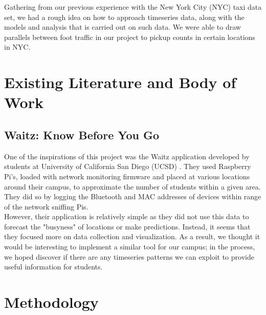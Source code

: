 \documentclass[journal, 11pt]{IEEEtran}
\begin{document}
\noindent Gathering from our previous experience with the New York City (NYC) taxi data set, we had a rough idea on how to approach timeseries data, along with the models and analysis that is carried out on such data. We were able to draw parallels between foot traffic in our project to pickup counts in certain locations in NYC.


\section{Existing Literature and Body of Work}

\subsection{Waitz: Know Before You Go}

\noindent One of the inspirations of this project was the Waitz application developed by students at University of California San Diego (UCSD) \cite{waitz}. They used Raspberry Pi's, loaded with network monitoring firmware and placed at various locations around their campus, to approximate the number of students within a given area. They did so by logging the Bluetooth and MAC addresses of devices within range of the network sniffing Pis.\\


\noindent However, their application is relatively simple as they did not use this data to forecast the "busyness" of locations or make predictions. Instead, it seems that they focused more on data collection and visualization. As a result, we thought it would be interesting to implement a similar tool for our campus; in the process, we hoped discover if there are any timeseries patterns we can exploit to provide useful information for students. \\


\section{Methodology}
\end{document}
